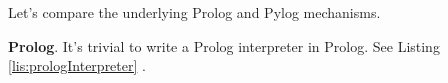 
\smallv
Let's compare the underlying Prolog and Pylog mechanisms. 
\smallv

\textbf{Prolog}. It's trivial to write a Prolog interpreter in Prolog. See Listing \ref{lis:prologInterpreter} \cite{Bartak1998}.

